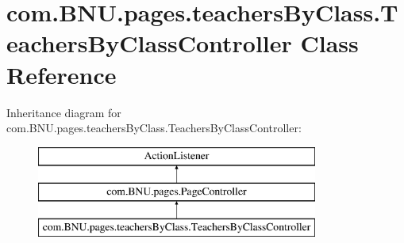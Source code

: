 \hypertarget{classcom_1_1_b_n_u_1_1pages_1_1teachers_by_class_1_1_teachers_by_class_controller}{}\section{com.\+B\+N\+U.\+pages.\+teachers\+By\+Class.\+Teachers\+By\+Class\+Controller Class Reference}
\label{classcom_1_1_b_n_u_1_1pages_1_1teachers_by_class_1_1_teachers_by_class_controller}
Inheritance diagram for com.\+B\+N\+U.\+pages.\+teachers\+By\+Class.\+Teachers\+By\+Class\+Controller\+:\begin{figure}[H]
\begin{center}
\leavevmode
\includegraphics[height=3.000000cm]{classcom_1_1_b_n_u_1_1pages_1_1teachers_by_class_1_1_teachers_by_class_controller}
\end{center}
\end{figure}
